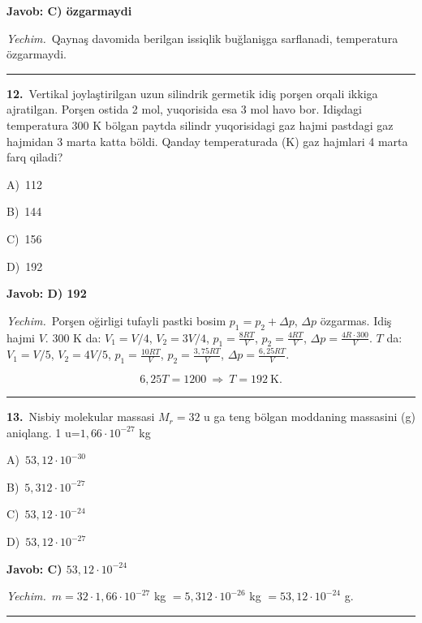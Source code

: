 \documentclass[11pt,a4paper]{article}
\newcommand{\opt}[2]{\hspace*{4mm}#1)\ #2\par}
\begin{document}
\noindent\colorbox{gray!12}{\parbox{\dimexpr\linewidth-2\fboxsep}{\textbf{Javob: C) özgarmaydi}}}\par\smallskip
\noindent\textit{Yechim.}\ Qaynaş davomida berilgan issiqlik buğlanişga sarflanadi, temperatura özgarmaydi.\par\par\medskip\hrule\medskip
{}\noindent\begin{minipage}{\linewidth}
\textbf{12.}\ Vertikal joylaştirilgan uzun silindrik germetik idiş porşen orqali ikkiga ajratilgan. Porşen ostida 2 mol, yuqorisida esa 3 mol havo bor. Idişdagi temperatura 300 K bölgan paytda silindr yuqorisidagi gaz hajmi pastdagi gaz hajmidan 3 marta katta böldi. Qanday temperaturada (K) gaz hajmlari 4 marta farq qiladi?\par\smallskip
\opt{A}{112}
\opt{B}{144}
\opt{C}{156}
\opt{D}{192}
\end{minipage}\vspace{2pt}\par
\noindent\colorbox{gray!12}{\parbox{\dimexpr\linewidth-2\fboxsep}{\textbf{Javob: D) 192}}}\par\smallskip
\noindent\textit{Yechim.}\ Porşen oğirligi tufayli pastki bosim $p_1=p_2+\Delta p$, $\Delta p$ özgarmas. Idiş hajmi $V$. 300 K da: $V_1=V/4$, $V_2=3V/4$, $p_1=\frac{8RT}{V}$, $p_2=\frac{4RT}{V}$, $\Delta p=\frac{4R\cdot300}{V}$. $T$ da: $V_1=V/5$, $V_2=4V/5$, $p_1=\frac{10RT}{V}$, $p_2=\frac{3{,}75RT}{V}$, $\Delta p=\frac{6{,}25RT}{V}$.\par
\[6{,}25T=1200\ \Rightarrow\ T=192\ \text{K}.\]\par\medskip\hrule\medskip
{}\noindent\begin{minipage}{\linewidth}
\textbf{13.}\ Nisbiy molekular massasi $M_r = 32$ u ga teng bölgan moddaning massasini (g) aniqlang. 1 u=$1{,}66\cdot10^{-27}$ kg\par\smallskip
\opt{A}{$53{,}12\cdot10^{-30}$}
\opt{B}{$5{,}312\cdot10^{-27}$}
\opt{C}{$53{,}12\cdot10^{-24}$}
\opt{D}{$53{,}12\cdot10^{-27}$}
\end{minipage}\vspace{2pt}\par
\noindent\colorbox{gray!12}{\parbox{\dimexpr\linewidth-2\fboxsep}{\textbf{Javob: C) $53{,}12\cdot10^{-24}$}}}\par\smallskip
\noindent\textit{Yechim.}\ $m=32\cdot1{,}66\cdot10^{-27}$ kg $=5{,}312\cdot10^{-26}$ kg $=53{,}12\cdot10^{-24}$ g.\par\par\medskip\hrule\medskip
\end{document}
